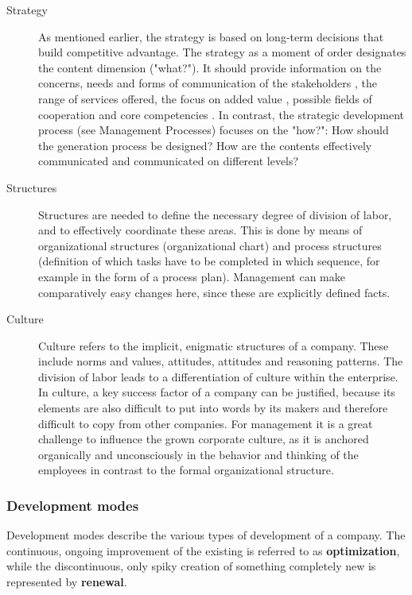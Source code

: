 \begin{description}
	\item[Strategy] As mentioned earlier, the strategy is based on long-term decisions that build competitive advantage. The strategy as a moment of order designates the content dimension ("what?"). It should provide information on the concerns, needs and forms of communication of the stakeholders , the range of services offered, the focus on added value , possible fields of cooperation and core competencies . In contrast, the strategic development process (see Management Processes) focuses on the "how?": How should the generation process be designed? How are the contents effectively communicated and communicated on different levels?
	\item[Structures] Structures are needed to define the necessary degree of division of labor, and to effectively coordinate these areas. This is done by means of organizational structures (organizational chart) and process structures (definition of which tasks have to be completed in which sequence, for example in the form of a process plan). Management can make comparatively easy changes here, since these are explicitly defined facts.
	\item[Culture] Culture refers to the implicit, enigmatic structures of a company. These include norms and values, attitudes, attitudes and reasoning patterns. The division of labor leads to a differentiation of culture within the enterprise. In culture, a key success factor of a company can be justified, because its elements are also difficult to put into words by its makers and therefore difficult to copy from other companies. For management it is a great challenge to influence the grown corporate culture, as it is anchored organically and unconsciously in the behavior and thinking of the employees in contrast to the formal organizational structure.
\end{description}

\subsubsection{Development modes}
Development modes describe the various types of development of a company. The continuous, ongoing improvement of the existing is referred to as \textbf{optimization}, while the discontinuous, only spiky creation of something completely new is represented by \textbf{renewal}.

